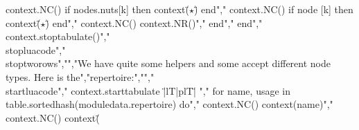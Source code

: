            context.NC() if nodes.nuts[k] then context(\"$⋆$\") end","                context.NC() if node      [k] then context(\"$⋆$\") end","                context.NC() context.NR()","            end","        end","    context.stoptabulate()","\\stopluacode","\\stoptworows","","We have quite some helpers and some accept different node types. Here is the","repertoire:","","\\startluacode","    context.starttabulate { \"|lT|plT|\" }","    for name, usage in table.sortedhash(moduledata.repertoire) do","        context.NC() context(name)","        context.NC() context(\"%